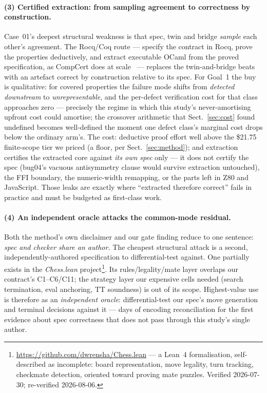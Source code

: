 \documentclass[runningheads]{llncs}
\begin{document}
\paragraph{(3) Certified extraction: from sampling agreement to correctness
by construction.} Case~01's deepest structural weakness is that spec, twin
and bridge \emph{sample} each other's agreement. The Rocq/Coq route ---
specify the contract in Rocq, prove the properties deductively, and extract
executable OCaml from the proved specification, as CompCert does at
scale~\cite{leroy2009} --- replaces the twin-and-bridge beats with an
artefact correct by construction relative to its spec. For Goal~1 the buy is
qualitative: for covered properties the failure mode shifts from
\emph{detected downstream} to \emph{unrepresentable}, and the per-defect
verification cost for that class approaches zero --- precisely the regime in
which this study's never-amortising upfront cost could amortise; the
crossover arithmetic that Sect.~\ref{sec:cost} found undefined becomes
well-defined the moment one defect class's marginal cost drops below the
ordinary arm's. The cost: deductive proof effort well above the \$21.75
finite-scope tier we priced (a floor, per Sect.~\ref{sec:method}); and
extraction certifies the extracted core against \emph{its own spec} only ---
it does not certify the spec (bug04's vacuous antisymmetry clause would
survive extraction untouched), the FFI boundary, the numeric-width
remapping, or the parts left in Z80 and JavaScript. Those leaks are exactly
where ``extracted therefore correct'' fails in practice and must be budgeted
as first-class work.

\paragraph{(4) An independent oracle attacks the common-mode residual.} Both
the method's own disclaimer and our gate finding reduce to one sentence:
\emph{spec and checker share an author.} The cheapest structural attack is a
second, independently-authored specification to differential-test against.
One partially exists in the \emph{Chess.lean} project\footnote{%
\url{https://github.com/dwrensha/Chess.lean} --- a Lean~4 formalisation,
self-described as incomplete: board representation, move legality, turn
tracking, checkmate detection, oriented toward proving mate puzzles.
Verified 2026-07-30; re-verified 2026-08-06.}. Its rules/legality/mate layer
overlaps our contract's C1--C6/C11; the strategy layer our expensive cells
needed (search termination, eval anchoring, TT soundness) is out of its
scope. Highest-value use is therefore as an \emph{independent oracle}:
differential-test our spec's move generation and terminal decisions against
it --- days of encoding reconciliation for the first evidence about spec
correctness that does not pass through this study's single author.
\end{document}
